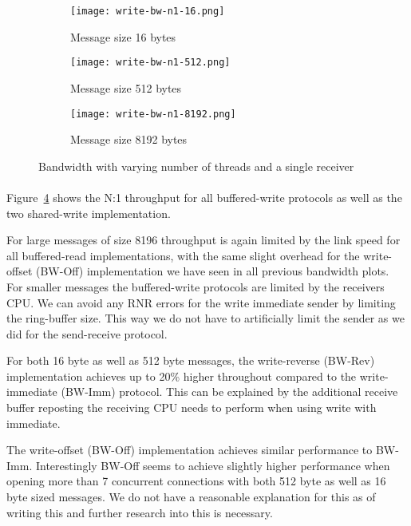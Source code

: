 \begin{figure}[ht]
  \centering
\begin{subfigure}[b]{0.49\textwidth}
  \centering
  \texttt{[image: write-bw-n1-16.png]}
  \caption{Message size 16 bytes}
  \label{fig:plot-write-bw-n1-16}
\end{subfigure}
\begin{subfigure}[b]{0.49\textwidth}
  \centering
  \texttt{[image: write-bw-n1-512.png]}
  \caption{Message size 512 bytes}
  \label{fig:plot-write-bw-n1-512}
\end{subfigure}
\begin{subfigure}[b]{0.49\textwidth}
  \centering
  \texttt{[image: write-bw-n1-8192.png]}
  \caption{Message size 8192 bytes}
  \label{fig:plot-write-bw-n1-8192}
\end{subfigure}
  \caption{Bandwidth with varying number of threads and a single receiver}
  \label{fig:plot-write-bw-n1}
\end{figure}

\paragraph{} Figure~\ref{fig:plot-write-bw-n1} shows the N:1 throughput for all buffered-write protocols as 
well as the two shared-write implementation.

For large messages of size 8196 throughput is again limited by the link speed for all buffered-read implementations, 
with the same slight overhead for the write-offset (BW-Off) implementation we have seen in all previous bandwidth plots.
For smaller messages the buffered-write protocols are limited by the receivers CPU. We can avoid any 
RNR errors for the write immediate sender by limiting the ring-buffer size. This way we do not have to artificially limit 
the sender as we did for the send-receive protocol.

For both 16 byte as well as 512 byte messages, the write-reverse (BW-Rev) implementation achieves up to 20\% higher throughout
compared to the write-immediate (BW-Imm) protocol. This can be explained by the additional receive buffer reposting the 
receiving CPU needs to perform when using write with immediate. 

The write-offset (BW-Off) implementation achieves similar performance to BW-Imm. Interestingly BW-Off seems to achieve slightly 
higher performance when opening more than 7 concurrent connections with both 512 byte as well as 16 byte sized messages. We do 
not have a reasonable explanation for this as of writing this and further research into this is necessary.



